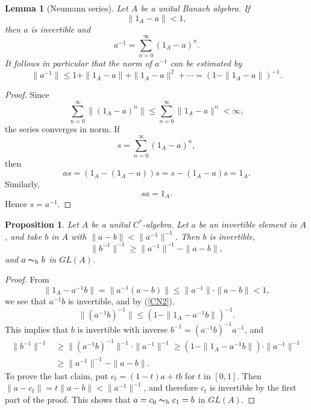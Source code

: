 \documentclass{book}
\newtheorem{lemma}[definition]{Lemma}
\newtheorem{proposition}[definition]{Proposition}
\def\cstar{\(C^*\)-algebra}
\begin{document}
\begin{lemma}[Neumann series]
Let \(A\) be a unital Banach algebra. If
\[
\|1_A-a\|<1,
\]
then \(a\) is invertible and
\begin{equation}\label{CN1}
a^{-1}
=
\sum_{n=0}^{\infty}{(1_A-a)}^n.
\end{equation}
It follows in particular that the norm of \(a^{-1}\) can be estimated by
\begin{equation}\label{CN2}
  \|a^{-1}\|\leq 1+\|1_A -a\|+\|1_A-a\|^2+\cdots=(1-\|1_A-a\|)^{-1}.
\end{equation}
\end{lemma}

\begin{proof}
Since
\[
\sum_{n=0}^{\infty}\|{(1_A-a)}^n\|
\le
\sum_{n=0}^{\infty}\|1_A-a\|^n
<\infty,
\]
the series converges in norm. If
\[
s=\sum_{n=0}^{\infty}{(1_A-a)}^n,
\]
then
\[
as=(1_A-(1_A-a))s
=s-(1_A-a)s
=1_A.
\]
Similarly,
\[
sa=1_A.
\]
Hence \(s=a^{-1}\).
\end{proof}
\begin{proposition}\label{prop:invPerturbation}
  Let \(A\) be a unital \cstar. Let \(a\) be an invertible element in \(A\), 
  and take \(b\) in \(A\) with \(\|a-b\|<\|a^{-1}\|^{-1}\). Then \(b\) is invertible,
  \[\|b^{-1}\|^{-1}\geq \|a^{-1}\|^{-1}-\|a-b\|,\]
  and \(a\thicksim_h b\) in \(GL(A)\).
\end{proposition}
\begin{proof}
  From 
  \[
    \|1_A-a^{-1}b\|=\|a^{-1}(a-b)\|\leq\|a^{-1}\|\cdot\|a-b\|<1,
  \]
  we see that \(a^{-1}b\) is invertible, and by (\ref{CN2}),
  \[
    \|(a^{-1}b)^{-1}\|\leq{(1-\|1_A-a^{-1}b\|)}^{-1}.
  \]
  This implies that \(b\) is invertible with inverse \(b^{-1}=(a^{-1}b)^{-1}a^{-1}\), and
  \begin{align*}
    \|b^{-1}\|^{-1}&\geq \|(a^{-1}b)^{-1}\|^{-1}\cdot\|a^{-1}\|^{-1}\geq(1-\|1_A-a^{-1}b\|)\cdot\|a^{-1}\|^{-1}\\
    &\geq\|a^{-1}\|^{-1}-\|a-b\|.
  \end{align*}
  To prove the last claim, put \(c_t=(1-t)a+tb\) for \(t\) in \([0,1]\). Then \(\|a-c_t\|=t\|a-b\|<\|a^{-1}\|^{-1}\),
  and therefore \(c_t\) is invertible by the first part of the proof. This shows that \(a=c_0\thicksim_h c_1 = b\) in \(GL(A)\).
\end{proof}
\end{document}
